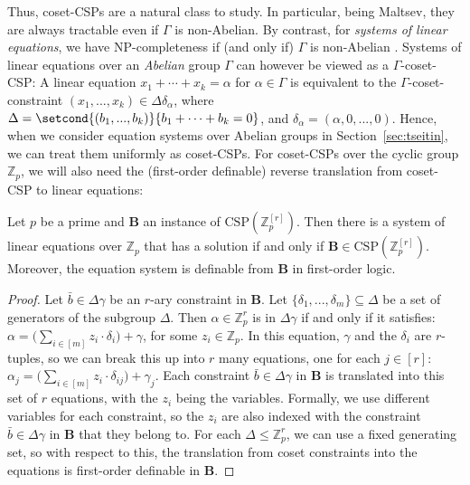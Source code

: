 \documentclass[a4paper,english, thm-restate]{lipics-v2021}
\newcommand{\StructB}{\mathbf{B}}
\newcommand{\CSP}[1]{\mathrm{CSP}(#1)}
\newcommand{\bbZ}{\mathbb{Z}}
\newcommand{\CosetGrpTmplt}[2]{#1^{[#2]}}
\begin{document}
	Thus, coset-CSPs are a natural class to study. In particular, being Maltsev, they are always tractable even if $\Gamma$ is non-Abelian. By contrast, for \emph{systems of linear equations}, we have NP-completeness if (and only if) $\Gamma$ is non-Abelian \cite{GOLDMANN}. 
	Systems of linear equations over an \emph{Abelian} group $\Gamma$
	can however be viewed as a $\Gamma$-coset-CSP:
	A linear equation $x_1 + \cdots + x_k = \alpha$ for $\alpha \in \Gamma$
	is equivalent to the $\Gamma$-coset-constraint
	$(x_1,...,x_k) \in \Delta\delta_\alpha$,
	where $\Delta = \setcond{ (b_1,...,b_k)}{b_1+\dots+b_k = 0}$,
	and $\delta_\alpha = (\alpha,0,...,0)$.
	Hence, when we consider equation systems over Abelian groups in Section~\ref{sec:tseitin}, we can treat them uniformly as coset-CSPs. 
	For coset-CSPs over the cyclic group $\bbZ_p$, we will also need the (first-order definable) reverse translation from coset-CSP to linear equations: 
	\begin{lemma}
		\label{lem:ZpcosetsAreEquations}
		Let $p$ be a prime and $\StructB$ an instance of $\CSP{\CosetGrpTmplt{\bbZ_p}{r}}$.
		Then there is a system of linear equations over $\bbZ_p$ that has a solution if and only if $\StructB \in \CSP{\CosetGrpTmplt{\bbZ_p}{r}}$. Moreover, the equation system is definable from $\StructB$ in first-order logic. 
	\end{lemma}	
	\begin{proof}
		Let $\bar{b} \in \Delta \gamma$ be an $r$-ary constraint in $\StructB$. 
		Let $\{\delta_1, ..., \delta_m\} \subseteq \Delta$ be a set of generators of the subgroup $\Delta$. Then $\alpha \in \bbZ_p^r$ is in $\Delta \gamma$ if and only if it satisfies:
		$\alpha = \Big(\sum_{i \in [m]} z_i \cdot \delta_i\Big) + \gamma$, for some $z_i \in \bbZ_p$. 
		In this equation, $\gamma$ and the $\delta_i$ are $r$-tuples, so we can break this up into $r$ many equations, one for each $j \in [r]$: $\alpha_j = \Big(\sum_{i \in [m]} z_i \cdot \delta_{ij}\Big) + \gamma_j$.
		Each constraint $\bar{b} \in \Delta \gamma$  in $\StructB$ is translated into this set of $r$ equations, with the $z_i$ being the variables. Formally, we use different variables for each constraint, so the $z_i$ are also indexed with the constraint $\bar{b} \in \Delta \gamma$ in $\StructB$ that they belong to.
		For each $\Delta \leq \bbZ_p^r$, we can use a fixed generating set, so with respect to this, the translation from coset constraints into the equations is first-order definable in $\StructB$. 
	\end{proof}	
	
\end{document}

